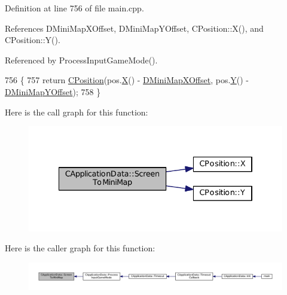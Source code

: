 Definition at line 756 of file main.\+cpp.



References D\+Mini\+Map\+X\+Offset, D\+Mini\+Map\+Y\+Offset, C\+Position\+::\+X(), and C\+Position\+::\+Y().



Referenced by Process\+Input\+Game\+Mode().


\begin{DoxyCode}
756                                                                \{
757     \textcolor{keywordflow}{return} \hyperlink{classCPosition}{CPosition}(pos.\hyperlink{classCPosition_a9a6b94d3b91df1492d166d9964c865fc}{X}() - \hyperlink{classCApplicationData_ae651b9d3963288c5c1f5aaf53bf9401d}{DMiniMapXOffset}, pos.\hyperlink{classCPosition_a1aa8a30e2f08dda1f797736ba8c13a87}{Y}() - 
      \hyperlink{classCApplicationData_ad33fc850bd8262a4bdf1f23e9477d5ad}{DMiniMapYOffset});
758 \}
\end{DoxyCode}
Here is the call graph for this function\+:\nopagebreak
\begin{figure}[H]
\begin{center}
\leavevmode
\includegraphics[width=334pt]{classCApplicationData_a61dfd0d1f56382b3a8f21add40e1f74a_cgraph}
\end{center}
\end{figure}
Here is the caller graph for this function\+:\nopagebreak
\begin{figure}[H]
\begin{center}
\leavevmode
\includegraphics[width=350pt]{classCApplicationData_a61dfd0d1f56382b3a8f21add40e1f74a_icgraph}
\end{center}
\end{figure}
\hypertarget{classCApplicationData_a2d956280cfd6074f56db3753c7467248}{}\label{classCApplicationData_a2d956280cfd6074f56db3753c7467248} 
